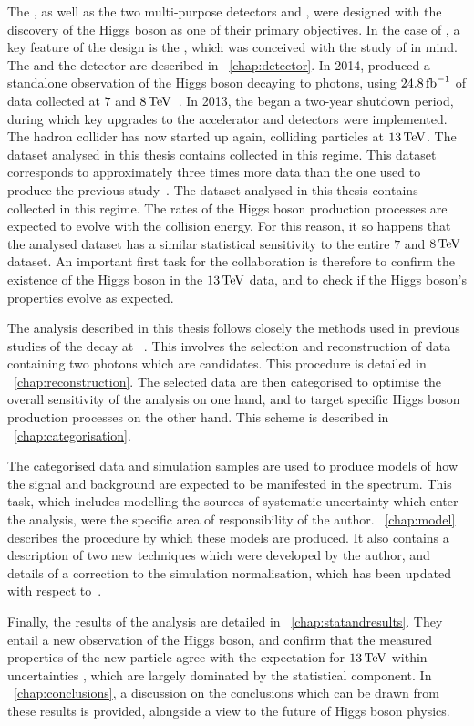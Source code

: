 The \LHC, as well as the two multi-purpose detectors \CMS and \ATLAS, were designed with the discovery of the Higgs boson as one of their primary objectives. In the case of \CMS, a key feature of the design is the \ECAL, which was conceived with the study of \Hgg in mind. The \LHC and the \CMS detector are described in \Chap~\ref{chap:detector}. In 2014, \CMS produced a standalone observation of the Higgs boson decaying to photons, using $24.8\,\text{fb}^{-1}$ of data collected at $7$ and $8\,\text{Te\hspace{-.08em}V}$~\cite{LegacyHgg}. In 2013, the \LHC began a two-year shutdown period, during which key upgrades to the accelerator and detectors were implemented. The hadron collider has now started up again, colliding particles at $13\,\text{Te\hspace{-.08em}V}$. 
\ifNewAnalysis
The dataset analysed in this thesis contains \thisanalysislumi\ifb collected in this regime. This dataset corresponds to approximately three times more data than the one used to produce the previous \Hgg study~\cite{CMS-PAS-HIG-16-020}.
\else
The dataset analysed in this thesis contains \thisanalysislumi\ifb collected in this regime. The rates of the Higgs boson production processes are expected to evolve with the collision energy. For this reason, it so happens that the analysed dataset has a similar statistical sensitivity to the entire $7$ and $8\,\text{Te\hspace{-.08em}V}$ dataset.
An important first task for the \CMS collaboration is therefore to confirm the existence of the Higgs boson in the $13\,\text{Te\hspace{-.08em}V}$ data, and to check if the Higgs boson's properties evolve as expected.  
\fi

The analysis described in this thesis follows closely the methods used in previous studies of the \Hgg decay at \CMS~\cite{LegacyHgg,CMS-PAS-HIG-15-005,CMS-PAS-HIG-16-020}. This involves the selection and reconstruction of data containing two photons which are \Hgg candidates. This procedure is detailed in \Chap~\ref{chap:reconstruction}. The selected data are then categorised to optimise the overall sensitivity of the analysis on one hand, and to target specific Higgs boson production processes on the other hand. This scheme is described in \Chap~\ref{chap:categorisation}. 

The categorised data and simulation samples are used to produce models of how the \Hgg signal and background are expected to be manifested in the \mgg spectrum. This task, which includes modelling the sources of systematic uncertainty which enter the analysis, were the specific area of responsibility of the author. \Chap~\ref{chap:model} describes the procedure by which these models are produced. It also contains a description of two new techniques which were developed by the author, and details of a correction to the simulation normalisation, which has been updated with respect to~\cite{CMS-PAS-HIG-16-020}.

Finally, the results of the analysis are detailed in \Chap~\ref{chap:statandresults}. They entail a new observation of the Higgs boson, and confirm that the measured properties of the new particle agree with the \SM expectation for $13\,\text{Te\hspace{-.08em}V}$ within uncertainties
\ifNewAnalysis
\else
, which are largely dominated by the statistical component.
\fi
In \Chap~\ref{chap:conclusions}, a discussion on the conclusions which can be drawn from these results is provided, alongside a view to the future of Higgs boson physics.


